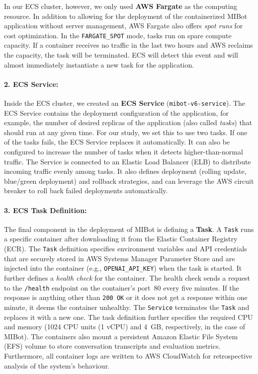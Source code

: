 In our ECS cluster, however, we only used \textbf{AWS Fargate} as the computing resource. In addition to allowing for the deployment of the containerized MIBot application without server management, AWS Fargate also offers \emph{spot runs} for cost optimization. In the \texttt{FARGATE\_SPOT} mode, tasks run on spare compute capacity. If a container receives no traffic in the last two hours and AWS reclaims the capacity, the task will be terminated. ECS will detect this event and will almost immediately instantiate a new task for the application.

\paragraph{2. ECS Service:}Inside the ECS cluster, we created an \textbf{ECS Service} (\texttt{mibot-v6-service}). The ECS Service contains the deployment configuration of the application, for example, the number of desired replicas of the application (also called \emph{tasks}) that should run at any given time.  For our study, we set this to use two tasks. If one of the tasks fails, the ECS Service replaces it automatically. It can also be configured to increase the number of tasks when it detects higher-than-normal traffic. The Service is connected to an Elastic Load Balancer (ELB) to distribute incoming traffic evenly among tasks. It also defines deployment (rolling update, blue/green deployment) and rollback strategies, and can leverage the AWS circuit breaker to roll back failed deployments automatically.

\paragraph{3. ECS Task Definition:}The final component in the deployment of MIBot is defining a \textbf{Task}. A \texttt{Task} runs a specific container after downloading it from the Elastic Container Registry (ECR). The \texttt{Task} definition specifies environment variables and API credentials that are securely stored in AWS Systems Manager Parameter Store and are injected into the container (e.g., \texttt{OPENAI\_API\_KEY}) when the task is started. It further defines a \emph{health check} for the container. The health check sends a request to the \texttt{/health} endpoint on the container's port~80 every five minutes. If the response is anything other than \texttt{200 OK} or it does not get a response within one minute, it deems the container unhealthy. The \texttt{Service} terminates the \texttt{Task} and replaces it with a new one. The task definition further specifies the required CPU and memory (1024 CPU units (1 vCPU) and 4~GB, respectively, in the case of MIBot). The containers also mount a persistent Amazon Elastic File System (EFS) volume to store conversation transcripts and evaluation metrics. Furthermore, all container logs are written to AWS CloudWatch for retrospective analysis of the system's behaviour.

